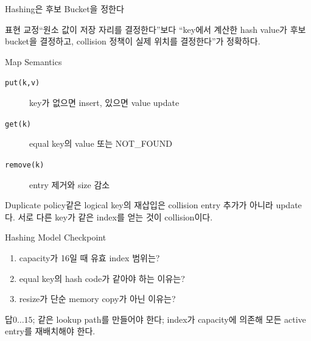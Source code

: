 \begin{frame}{Hashing은 후보 Bucket을 정한다}
\centering{}
\begin{alertblock}{표현 교정}“원소 값이 저장 자리를 결정한다”보다 “key에서 계산한 hash value가 후보 bucket을 결정하고, collision 정책이 실제 위치를 결정한다”가 정확하다.\end{alertblock}
\end{frame}
\begin{frame}{Map Semantics}
\begin{description}
\item[\texttt{put(k,v)}] key가 없으면 insert, 있으면 value update
\item[\texttt{get(k)}] equal key의 value 또는 NOT\_FOUND
\item[\texttt{remove(k)}] entry 제거와 size 감소
\end{description}
\begin{block}{Duplicate policy}같은 logical key의 재삽입은 collision entry 추가가 아니라 update다. 서로 다른 key가 같은 index를 얻는 것이 collision이다.\end{block}
\end{frame}
\begin{frame}{Hashing Model Checkpoint}
\begin{enumerate}\item capacity가 16일 때 유효 index 범위는?\item equal key의 hash code가 같아야 하는 이유는?\item resize가 단순 memory copy가 아닌 이유는?\end{enumerate}
\begin{exampleblock}{답}$0\ldots15$; 같은 lookup path를 만들어야 한다; index가 capacity에 의존해 모든 active entry를 재배치해야 한다.\end{exampleblock}
\end{frame}
